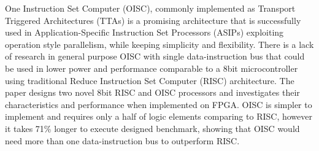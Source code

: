 \iffalse
The abstract is written last and summarises the important points you are making in the report using one sentence for each point:

* What is the topic of the work? What is the goal?
* Why are you doing it? What are your motivations?
* Does this work appear in the literature and if so, what are you doing differently?
* What is the most significant result? Was it unexpected? What impact will it have?
\fi

One Instruction Set Computer (OISC), commonly implemented as Transport Triggered Architectures (TTAs) is a promising architecture that is successfully used in Application-Specific Instruction Set Processors (ASIPs) exploiting operation style parallelism, while keeping simplicity and flexibility. There is a lack of research in general purpose OISC with single data-instruction bus that could be used in lower power and performance comparable to a 8bit microcontroller using traditional Reduce Instruction Set Computer (RISC) architecture. The paper designs two novel 8bit RISC and OISC processors and investigates their characteristics and performance when implemented on FPGA. OISC is simpler to implement and requires only a half of logic elements comparing to RISC, however it takes 71\% longer to execute designed benchmark, showing that OISC would need more than one data-instruction bus to outperform RISC.